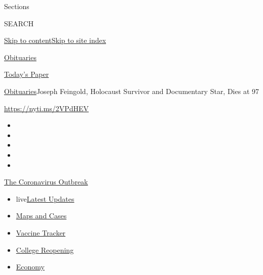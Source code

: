 Sections

SEARCH

\protect\hyperlink{site-content}{Skip to
content}\protect\hyperlink{site-index}{Skip to site index}

\href{https://www.nytimes.com/section/obituaries}{Obituaries}

\href{https://myaccount.nytimes.com/auth/login?response_type=cookie\&client_id=vi}{}

\href{https://www.nytimes.com/section/todayspaper}{Today's Paper}

\href{/section/obituaries}{Obituaries}\textbar{}Joseph Feingold,
Holocaust Survivor and Documentary Star, Dies at 97

\url{https://nyti.ms/2VPdHEV}

\begin{itemize}
\item
\item
\item
\item
\item
\end{itemize}

\href{https://www.nytimes.com/news-event/coronavirus?action=click\&pgtype=Article\&state=default\&region=TOP_BANNER\&context=storylines_menu}{The
Coronavirus Outbreak}

\begin{itemize}
\tightlist
\item
  live\href{https://www.nytimes.com/2020/08/03/world/coronavirus-covid-19.html?action=click\&pgtype=Article\&state=default\&region=TOP_BANNER\&context=storylines_menu}{Latest
  Updates}
\item
  \href{https://www.nytimes.com/interactive/2020/us/coronavirus-us-cases.html?action=click\&pgtype=Article\&state=default\&region=TOP_BANNER\&context=storylines_menu}{Maps
  and Cases}
\item
  \href{https://www.nytimes.com/interactive/2020/science/coronavirus-vaccine-tracker.html?action=click\&pgtype=Article\&state=default\&region=TOP_BANNER\&context=storylines_menu}{Vaccine
  Tracker}
\item
  \href{https://www.nytimes.com/2020/08/02/us/covid-college-reopening.html?action=click\&pgtype=Article\&state=default\&region=TOP_BANNER\&context=storylines_menu}{College
  Reopening}
\item
  \href{https://www.nytimes.com/live/2020/08/03/business/stock-market-today-coronavirus?action=click\&pgtype=Article\&state=default\&region=TOP_BANNER\&context=storylines_menu}{Economy}
\end{itemize}

